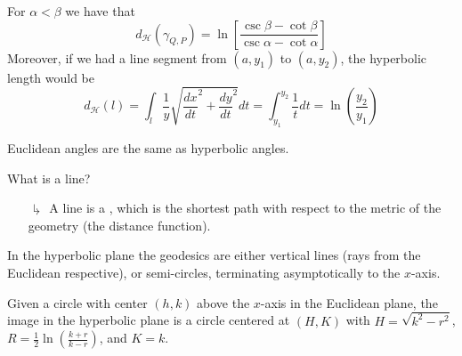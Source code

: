 \documentclass[12pt]{report}
\begin{document}
\begin{prop}{}{}
\begin{center}
    \end{center}
    For $\alpha < \beta$ we have that \begin{equation}
        d_{\mathcal{H}}(\gamma_{Q,P}) = \ln\left[\frac{\csc\beta - \cot\beta}{\csc\alpha - \cot\alpha}\right]
    \end{equation}
    Moreover, if we had a line segment from $(a,y_1)$ to $(a,y_2)$, the hyperbolic length would be \begin{equation}
        d_{\mathcal{H}}(l) = \int_{l}\frac{1}{y}\sqrt{\frac{dx}{dt}^2+\frac{dy}{dt}^2}dt = \int_{y_1}^{y_2}\frac{1}{t}dt = \ln\left(\frac{y_2}{y_1}\right)
    \end{equation}
\end{prop}

\begin{prop}{}{}
    Euclidean angles are the same as hyperbolic angles.
\end{prop}

\begin{qest}
    What is a line?
\end{qest}
\begin{enumerate}
    \item[$\drsh$] A line is a , which is the shortest path with respect to the metric of the geometry (the distance function). 
\end{enumerate}
\begin{thm}{}{}
    In the hyperbolic plane the geodesics are either vertical lines (rays from the Euclidean respective), or semi-circles, terminating asymptotically to the $x$-axis.
\end{thm}

\begin{rmk}{}{}
    Given a circle with center $(h,k)$ above the $x$-axis in the Euclidean plane, the image in the hyperbolic plane is a circle centered at $(H,K)$ with $H = \sqrt{k^2-r^2}$, $R = \frac{1}{2}\ln\left(\frac{k+r}{k-r}\right)$, and $K = k$.
\end{rmk}
\end{document}
